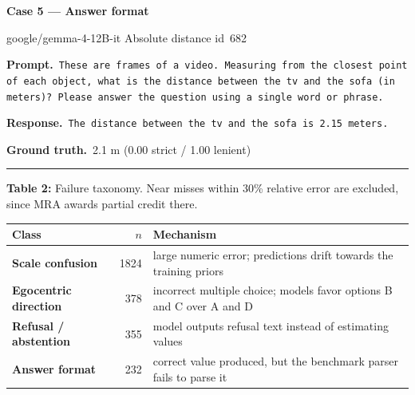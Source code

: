 \documentclass{article}
\begin{document}
\begin{minipage}[t]{0.485\textwidth}\raggedright
\noindent\textbf{Case 5 --- Answer format}\par
{\scriptsize google/gemma-4-12B-it \quad\textbar\quad Absolute distance \quad\textbar\quad id~682}\par\vspace{0.5pt}
{\fontsize{6.5}{7.8}\selectfont\raggedright\setlength{\parindent}{0pt}
\textbf{Prompt.}\ \texttt{These are frames of a video.\newline
Measuring from the closest point of each object, what is the distance between the tv and the sofa (in meters)?\newline
Please answer the question using a single word or phrase.}\par\vspace{0.5pt}
\textbf{Response.}\ \texttt{The distance between the tv and the sofa is 2.15 meters.}\par\vspace{0.5pt}
\textbf{Ground truth.}\ 2.1 m (0.00 strict / 1.00 lenient)\par}
\vspace{0.5pt}\hrule\vspace{1.5pt}
\end{minipage}
\par\vspace{1pt}

\begin{center}
\footnotesize\textbf{Table 2:} Failure taxonomy. Near misses within 30\% relative error are
excluded, since MRA awards partial credit there.\par\vspace{1pt}
{\scriptsize\begin{tabular}{@{}p{}rp{}@{}}
\toprule
Class & $n$ & Mechanism \\
\midrule
\textbf{Scale confusion} & 1824 & large numeric error; predictions drift towards the training priors \\
\textbf{Egocentric direction} & 378 & incorrect multiple choice; models favor options B and C over A and D \\
\textbf{Refusal / abstention} & 355 & model outputs refusal text instead of estimating values \\
\textbf{Answer format} & 232 & correct value produced, but the benchmark parser fails to parse it \\
\bottomrule
\end{tabular}}
\end{center}
\end{document}

